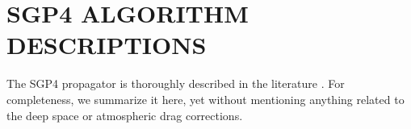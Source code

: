 \documentclass{article}
\begin{document}



\section{SGP4 ALGORITHM DESCRIPTIONS}
\label{sec:algorithms}

The SGP4 propagator is thoroughly described in the literature \cite{HootsRoehrich1980,ValladoCrawfordHujsakKelso2006}. For completeness, we summarize it here, yet without mentioning anything related to the deep space or atmospheric drag corrections.

%

\end{document}
